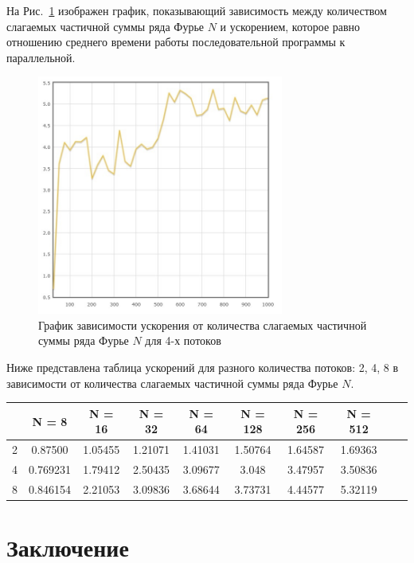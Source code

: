 \documentclass{spisok-article}
\begin{document}
На Рис.~\ref{ris3:image} изображен график, показывающий зависимость между количеством слагаемых частичной суммы ряда Фурье $N$ и ускорением, которое равно отношению среднего времени работы последовательной программы к параллельной.

\begin{figure}[h]
\begin{center}
	\includegraphics[width=81mm]{paral3.jpg}
	\caption{График зависимости ускорения от количества слагаемых частичной суммы ряда Фурье $N$ для 4-х потоков}
	\label{ris3:image}
\end{center}
\end{figure}

Ниже представлена таблица ускорений для разного количества потоков: 2, 4, 8 в зависимости от количества слагаемых частичной суммы ряда Фурье $N$.
\bigskip
\begin{center}
\begin{tabular}{|c|c|c|c|c|c|c|c|c|c|}
\hline
 &N = 8 & N = 16 & N = 32 & N = 64 & N = 128 & N = 256 & N = 512 \\
\hline
2 & 0.87500 & 1.05455 & 1.21071 & 1.41031 & 1.50764 & 1.64587 & 1.69363 \\
\hline
4 & 0.769231 & 1.79412 & 2.50435 & 3.09677 & 3.048 & 3.47957 & 3.50836 \\
\hline
8 & 0.846154 & 2.21053 & 3.09836 & 3.68644 & 3.73731 & 4.44577 & 5.32119 \\
\hline
\end{tabular}
\end{center}
\bigskip

\section{Заключение}
\end{document}
